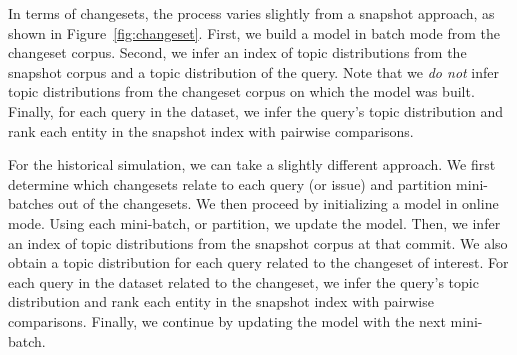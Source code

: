 In terms of changesets, the process varies slightly from a snapshot approach, as
shown in Figure~\ref{fig:changeset}.  First, we build a model in batch mode
from the changeset corpus.  Second, we infer an index of topic distributions
from the snapshot corpus and a topic distribution of the query.  Note that we
\emph{do not} infer topic distributions from the changeset corpus on which the
model was built.  Finally, for each query in the dataset, we infer the query's
topic distribution and rank each entity in the snapshot index with pairwise
comparisons.

For the historical simulation, we can take a slightly different approach.  We
first determine which changesets relate to each query (or issue) and partition
mini-batches out of the changesets.  We then proceed by initializing a model in
online mode.  Using each mini-batch, or partition, we update the model.  Then,
we infer an index of topic distributions from the snapshot corpus at that
commit.  We also obtain a topic distribution for each query related to the
changeset of interest.  For each query in the dataset related to the changeset,
we infer the query's topic distribution and rank each entity in the snapshot
index with pairwise comparisons. Finally, we continue by updating the model with
the next mini-batch.

